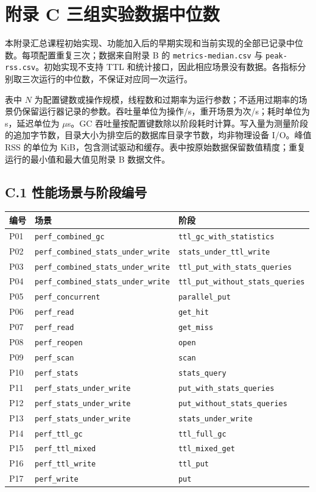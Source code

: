 \documentclass[UTF8,a4paper,10pt,twocolumn,fontset=fandol]{ctexart}
\begin{document}
\endgroup
\clearpage
\onecolumn
\section*{附录 C 三组实验数据中位数}
本附录汇总课程初始实现、功能加入后的早期实现和当前实现的全部已记录中位数。每项配置重复三次；数据来自附录 B 的 \texttt{metrics-median.csv} 与 \texttt{peak-rss.csv}。初始实现不支持 TTL 和统计接口，因此相应场景没有数据。各指标分别取三次运行的中位数，不保证对应同一次运行。

表中 $N$ 为配置键数或操作规模，线程数和过期率为运行参数；不适用过期率的场景仍保留运行器记录的参数。吞吐量单位为操作/s，重开场景为次/s；耗时单位为 s，延迟单位为 $\mu$s。GC 吞吐量按配置键数除以阶段耗时计算。写入量为测量阶段的追加字节数，目录大小为排空后的数据库目录字节数，均非物理设备 I/O。峰值 RSS 的单位为 KiB，包含测试驱动和缓存。表中按原始数据保留数值精度；重复运行的最小值和最大值见附录 B 数据文件。

\subsection*{C.1 性能场景与阶段编号}
\begin{center}\small
\begin{tabular}{@{}lll@{}}
\toprule
编号 & 场景 & 阶段 \\
\midrule
P01 & \texttt{perf\_combined\_gc} & \texttt{ttl\_gc\_with\_statistics} \\
P02 & \texttt{perf\_combined\_stats\_under\_write} & \texttt{stats\_under\_ttl\_write} \\
P03 & \texttt{perf\_combined\_stats\_under\_write} & \texttt{ttl\_put\_with\_stats\_queries} \\
P04 & \texttt{perf\_combined\_stats\_under\_write} & \texttt{ttl\_put\_without\_stats\_queries} \\
P05 & \texttt{perf\_concurrent} & \texttt{parallel\_put} \\
P06 & \texttt{perf\_read} & \texttt{get\_hit} \\
P07 & \texttt{perf\_read} & \texttt{get\_miss} \\
P08 & \texttt{perf\_reopen} & \texttt{open} \\
P09 & \texttt{perf\_scan} & \texttt{scan} \\
P10 & \texttt{perf\_stats} & \texttt{stats\_query} \\
P11 & \texttt{perf\_stats\_under\_write} & \texttt{put\_with\_stats\_queries} \\
P12 & \texttt{perf\_stats\_under\_write} & \texttt{put\_without\_stats\_queries} \\
P13 & \texttt{perf\_stats\_under\_write} & \texttt{stats\_under\_write} \\
P14 & \texttt{perf\_ttl\_gc} & \texttt{ttl\_full\_gc} \\
P15 & \texttt{perf\_ttl\_mixed} & \texttt{ttl\_mixed\_get} \\
P16 & \texttt{perf\_ttl\_write} & \texttt{ttl\_put} \\
P17 & \texttt{perf\_write} & \texttt{put} \\
\bottomrule
\end{tabular}
\end{center}
\end{document}
